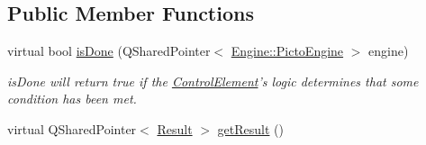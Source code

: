 \subsection*{Public Member Functions}
\begin{DoxyCompactItemize}
\item 
\hypertarget{class_picto_1_1_control_element_acf73c056833f5da319a0ae046b82b3a8}{virtual bool \hyperlink{class_picto_1_1_control_element_acf73c056833f5da319a0ae046b82b3a8}{is\-Done} (Q\-Shared\-Pointer$<$ \hyperlink{class_picto_1_1_engine_1_1_picto_engine}{Engine\-::\-Picto\-Engine} $>$ engine)}\label{class_picto_1_1_control_element_acf73c056833f5da319a0ae046b82b3a8}

\begin{DoxyCompactList}\small\item\em is\-Done will return true if the \hyperlink{class_picto_1_1_control_element}{Control\-Element}'s logic determines that some condition has been met. \end{DoxyCompactList}\item 
\hypertarget{class_picto_1_1_control_element_a24e223e49d560fa2c3d9e6f02d68bafb}{virtual Q\-Shared\-Pointer$<$ \hyperlink{class_picto_1_1_result}{Result} $>$ \hyperlink{class_picto_1_1_control_element_a24e223e49d560fa2c3d9e6f02d68bafb}{get\-Result} ()}\label{class_picto_1_1_control_element_a24e223e49d560fa2c3d9e6f02d68bafb}


\end{DoxyCompactItemize}
